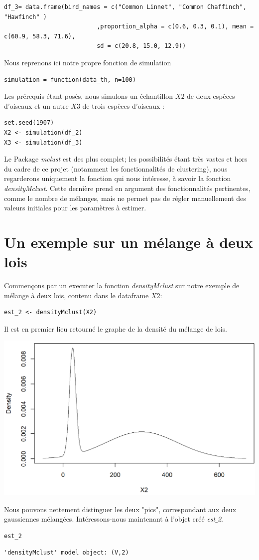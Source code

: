 \documentclass[frenchb]{report}
\newcommand{\1}{\mathbbm{1}}
\theoremstyle{definition}\newtheorem{defn}{Définition}
\theoremstyle{definition}\newtheorem{exm}{Exemple}
\theoremstyle{definition}\newtheorem{nota}{Notation}
\theoremstyle{definition}\newtheorem{rem}{Remarque}
\begin{document}
\begin{appendices}
\begin{lstlisting}
df_3= data.frame(bird_names = c("Common Linnet", "Common Chaffinch", "Hawfinch" )
                          ,proportion_alpha = c(0.6, 0.3, 0.1), mean = c(60.9, 58.3, 71.6),
                          sd = c(20.8, 15.0, 12.9))
\end{lstlisting}
%
Nous reprenons ici notre propre fonction de simulation
\begin{lstlisting}
simulation = function(data_th, n=100)
\end{lstlisting}
%
Les prérequis étant posés, nous simulons un échantillon $X2$ de deux espèces d'oiseaux et un autre $X3$ de trois espèces d'oiseaux :
\begin{lstlisting}
set.seed(1907)
X2 <- simulation(df_2)
X3 <- simulation(df_3)
\end{lstlisting}
%
Le Package \textit{mclust} est des plus complet; les possibilités étant très vastes et hors du cadre de ce projet (notamment les fonctionnalités de clustering), nous regarderons uniquement la fonction qui nous intéresse, à savoir la fonction \textit{densityMclust}. \newline
Cette dernière prend en argument des fonctionnalités pertinentes, comme le nombre de mélanges, mais ne permet pas de régler manuellement des valeurs initiales pour les paramètres à estimer.
%

\section{Un exemple sur un mélange à deux lois}
Commençons par un executer la fonction \textit{densityMclust} sur notre exemple de mélange à deux lois, contenu dans le dataframe $X2$:
\begin{lstlisting}
est_2 <- densityMclust(X2)
\end{lstlisting}
%
Il est en premier lieu retourné le graphe de la densité du mélange de lois.
\begin{center}\includegraphics[scale=0.75]{fig1.png}\end{center}
Nous pouvons nettement distinguer les deux "pics", correspondant aux deux gaussiennes mélangées.
Intéressons-nous maintenant à l'objet créé \textit{est$\_$2}.
\begin{lstlisting}
est_2
\end{lstlisting}
\begin{verbatim}
'densityMclust' model object: (V,2) 


\end{verbatim}
\end{appendices}
\end{document}
